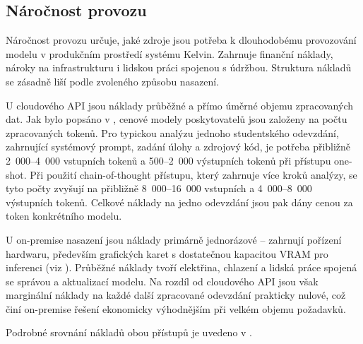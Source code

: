 \subsection{Náročnost provozu}
\label{subsec:criteria-operational}

Náročnost provozu určuje, jaké zdroje jsou potřeba k dlouhodobému provozování modelu v produkčním prostředí systému Kelvin.
Zahrnuje finanční náklady, nároky na infrastrukturu i lidskou práci spojenou s údržbou.
Struktura nákladů se zásadně liší podle zvoleného způsobu nasazení.

U cloudového API jsou náklady průběžné a přímo úměrné objemu zpracovaných dat.
Jak bylo popsáno v , cenové modely poskytovatelů jsou založeny na počtu zpracovaných tokenů.
Pro typickou analýzu jednoho studentského odevzdání, zahrnující systémový prompt, zadání úlohy a zdrojový kód, je potřeba přibližně 2~000--4~000 vstupních tokenů a 500--2~000 výstupních tokenů při přístupu one-shot.
Při použití chain-of-thought přístupu, který zahrnuje více kroků analýzy, se tyto počty zvyšují na přibližně 8~000--16~000 vstupních a 4~000--8~000 výstupních tokenů.
Celkové náklady na jedno odevzdání jsou pak dány cenou za token konkrétního modelu.

U on-premise nasazení jsou náklady primárně jednorázové -- zahrnují pořízení hardwaru, především grafických karet s dostatečnou kapacitou VRAM pro inferenci (viz ).
Průběžné náklady tvoří elektřina, chlazení a lidská práce spojená se správou a aktualizací modelu.
Na rozdíl od cloudového API jsou však marginální náklady na každé další zpracované odevzdání prakticky nulové, což činí on-premise řešení ekonomicky výhodnějším při velkém objemu požadavků.

Podrobné srovnání nákladů obou přístupů je uvedeno v .

\endinput